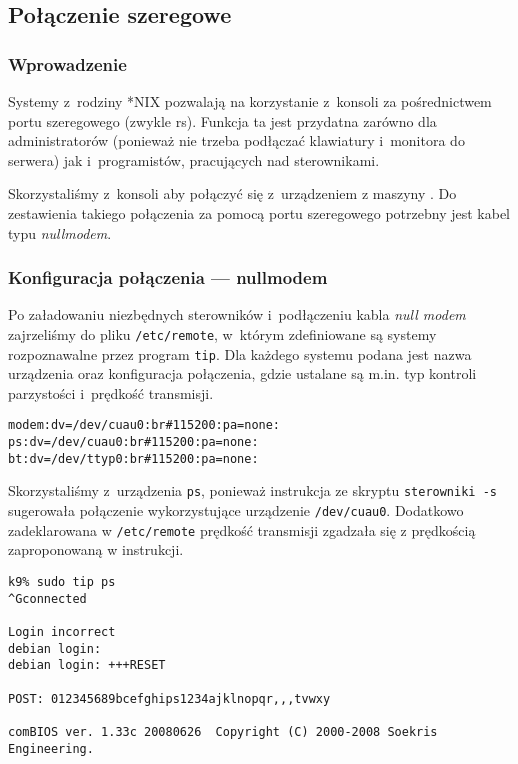 \subsection{Połączenie szeregowe}

\subsubsection{Wprowadzenie}

Systemy z~rodziny *NIX pozwalają na korzystanie z~konsoli za pośrednictwem portu
szeregowego (zwykle rs). Funkcja ta jest przydatna zarówno dla
administratorów (ponieważ nie trzeba podłączać klawiatury i~monitora do serwera)
jak i~programistów, pracujących nad sterownikami.

Skorzystaliśmy z~konsoli aby połączyć się z~urządzeniem \zielone{} z maszyny
\kdziew. Do zestawienia takiego połączenia za pomocą portu szeregowego potrzebny
jest kabel typu \emph{null\dywiz modem}\cite{serial-console}.

\subsubsection{Konfiguracja połączenia --- null\dywiz modem}
\label{sec:serial:null-modem}

Po załadowaniu niezbędnych sterowników i~podłączeniu kabla \emph{null\dywiz
modem} zajrzeliśmy do pliku \texttt{/etc/remote}, w~którym zdefiniowane są
systemy rozpoznawalne przez program \texttt{tip}. Dla każdego systemu podana
jest nazwa urządzenia oraz konfiguracja połączenia, gdzie ustalane są m.in. typ
kontroli parzystości i~prędkość transmisji.

\begin{lstlisting}[caption={Linie z \texttt{/etc/remote} dotyczące naszego połączenia.}]
modem:dv=/dev/cuau0:br#115200:pa=none:
ps:dv=/dev/cuau0:br#115200:pa=none:
bt:dv=/dev/ttyp0:br#115200:pa=none:
\end{lstlisting}

Skorzystaliśmy z~urządzenia \texttt{ps}, ponieważ instrukcja ze skryptu
\texttt{sterowniki~-s} sugerowała połączenie wykorzystujące urządzenie
\texttt{/dev/cuau0}. Dodatkowo zadeklarowana w \texttt{/etc/remote} prędkość
transmisji zgadzała się z prędkością zaproponowaną w instrukcji.

\begin{lstlisting}[caption={Połączenie z konsolą maszyny \zielone{} za pomocą programu \texttt{tip}.}]
k9% sudo tip ps
^Gconnected

Login incorrect
debian login:
debian login: +++RESET

POST: 012345689bcefghips1234ajklnopqr,,,tvwxy

comBIOS ver. 1.33c 20080626  Copyright (C) 2000-2008 Soekris Engineering.
\end{lstlisting}

